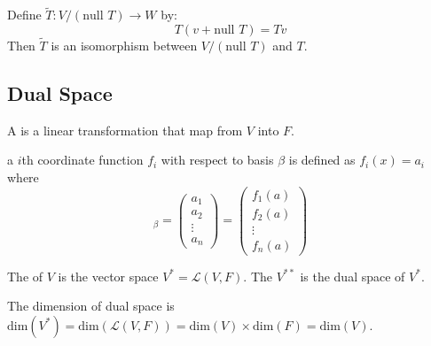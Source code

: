 \begin{theorem}
    Define $\tilde{T}: V/(\text{null } T) \rightarrow W$ by:
    \begin{equation*}
        T(v + \text{null } T) = Tv
    \end{equation*}
    Then $\tilde{T}$ is an isomorphism between $V/(\text{null } T)$ and $T$.
\end{theorem}



\subsection{Dual Space}


\begin{definition}
	A  is a linear transformation that map from $V$ into $F$.
\end{definition}

\begin{definition}
	a $i$th coordinate function $f_i$ with respect to basis $\beta$ is defined as $f_i(x) = a_i$ where
	\begin{equation*}
		[x]_\beta = \begin{pmatrix}
			a_1 \\
			a_2 \\
			\vdots \\
			a_n
		\end{pmatrix} = \begin{pmatrix}
			f_1(a) \\
			f_2(a) \\
			\vdots \\
			f_n(a)
		\end{pmatrix}
	\end{equation*}
\end{definition}



\begin{definition}
	The  of $V$ is the vector space $V^* = \mathcal{L}(V,F)$. The  $V^{**}$ is the dual space of $V^*$.
\end{definition}


The dimension of dual space is $\text{dim}(V^*)=\text{dim}(\mathcal{L}(V,F)) = \text{dim}(V) \times \text{dim}(F) = \text{dim}(V)$.


